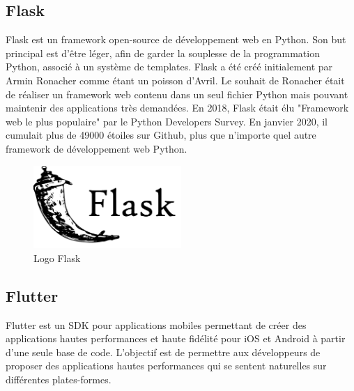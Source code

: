 \subsection{Flask}
Flask \cite{WelcomeFlaskFlask} est un framework open-source de développement web en Python. Son but principal est d'être léger, afin de garder la souplesse de la programmation Python, associé à un système de templates.
Flask a été créé initialement par Armin Ronacher comme étant un poisson d’Avril. Le souhait de Ronacher était de réaliser un framework web contenu dans un seul fichier Python mais pouvant maintenir des applications très demandées.
En 2018, Flask était élu "Framework web le plus populaire" par le Python Developers Survey. En janvier 2020, il cumulait plus de 49000 étoiles sur Github, plus que n'importe quel autre framework de développement web Python\cite{FlaskFramework2020}.
\begin{figure}[h!]
    \center
    \includegraphics[width=0.50\textwidth]{Images/chapter3/flask.png}
    \caption{Logo Flask}
    \label{fig:Technologies}
\end{figure}

\subsection{Flutter}
Flutter \cite{FlutterBeautifulNative} est un SDK pour applications mobiles permettant de créer des applications hautes performances et haute fidélité pour iOS et Android à partir d’une seule base de code.
L’objectif est de permettre aux développeurs de proposer des applications hautes performances qui se sentent naturelles sur différentes plates-formes.

